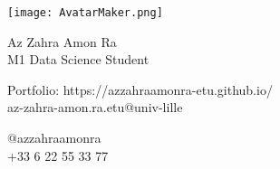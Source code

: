 \documentclass{article}
\begin{document}
\centering
\texttt{[image: AvatarMaker.png]}\\[1pt] %

\parbox{2in}{\Large \centering Az Zahra Amon Ra\\[1pt]
\normalsize M1 Data Science Student}

\vfill

\raggedright
\begin{multicols}{2}
\fontsize{7}{10}\selectfont Portfolio: https://azzahraamonra-etu.github.io/\\
\fontsize{7}{10}\selectfont az-zahra-amon.ra.etu@univ-lille

\columnbreak
\raggedleft
@azzahraamonra\\
+33 6 22 55 33 77%

\end{multicols}%
\end{document}
